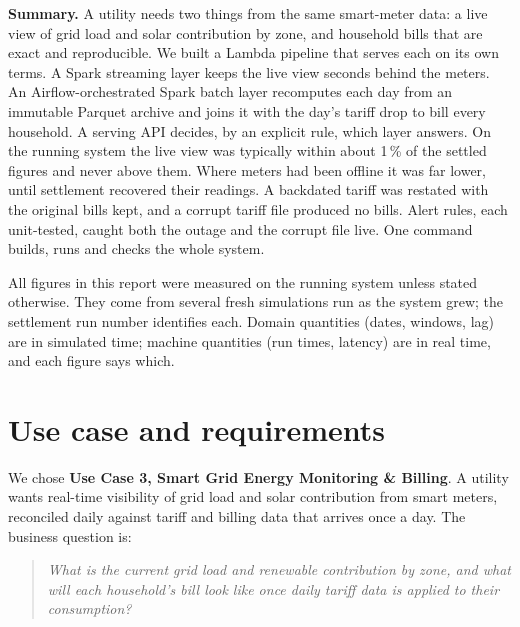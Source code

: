 \documentclass[11pt,a4paper]{article}
\begin{document}
\begin{titlepage}
  {\small{\color{accent}\textbf{Summary.}}\enspace
  A utility needs two things from the same smart-meter data: a live view of grid load
  and solar contribution by zone, and household bills that are exact and reproducible.
  We built a Lambda pipeline that serves each on its own terms. A Spark streaming layer
  keeps the live view seconds behind the meters. An Airflow-orchestrated Spark batch
  layer recomputes each day from an immutable Parquet archive and joins it with the
  day's tariff drop to bill every household. A serving API decides, by an explicit rule,
  which layer answers. On the running system the live view was typically within about
  1\,\% of the settled figures and never above them. Where meters had been offline it was
  far lower, until settlement recovered their readings. A backdated tariff was restated with the
  original bills kept, and a corrupt tariff file produced no bills. Alert rules, each
  unit-tested, caught both the outage and the corrupt file live. One command builds,
  runs and checks the whole system.\par}
  \vfill
  {\small\color{muted} All figures in this report were measured on the running system unless
  stated otherwise. They come from several fresh simulations run as the system grew; the
  settlement run number identifies each. Domain quantities (dates, windows, lag) are in
  simulated time; machine quantities (run times, latency) are in real time, and each figure
  says which.}
\end{titlepage}

\section{Use case and requirements}
\label{sec:usecase}

We chose \textbf{Use Case 3, Smart Grid Energy Monitoring \& Billing}. A utility
wants real-time visibility of grid load and solar contribution from smart meters,
reconciled daily against tariff and billing data that arrives once a day. The
business question is:

\begin{quote}\itshape
What is the current grid load and renewable contribution by zone, and what will
each household's bill look like once daily tariff data is applied to their
consumption?
\end{quote}
\end{document}
